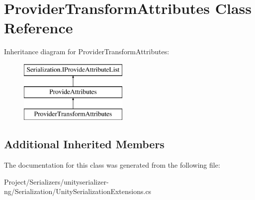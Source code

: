 \hypertarget{class_provider_transform_attributes}{}\section{Provider\+Transform\+Attributes Class Reference}
\label{class_provider_transform_attributes}
Inheritance diagram for Provider\+Transform\+Attributes\+:\begin{figure}[H]
\begin{center}
\leavevmode
\includegraphics[height=3.000000cm]{class_provider_transform_attributes}
\end{center}
\end{figure}
\subsection*{Additional Inherited Members}


The documentation for this class was generated from the following file\+:\begin{DoxyCompactItemize}
\item 
Project/\+Serializers/unityserializer-\/ng/\+Serialization/Unity\+Serialization\+Extensions.\+cs\end{DoxyCompactItemize}

